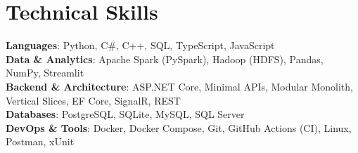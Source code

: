 \documentclass[letterpaper,11pt]{article}
\begin{document}
\section{Technical Skills}
 \begin{itemize}[leftmargin=0.15in, label={}]
    \small{\item{
     \textbf{Languages}{: Python, C\#, C++, SQL, TypeScript, JavaScript} \\
     \textbf{Data \& Analytics}{: Apache Spark (PySpark), Hadoop (HDFS), Pandas, NumPy, Streamlit} \\
     \textbf{Backend \& Architecture}{: ASP.NET Core, Minimal APIs, Modular Monolith, Vertical Slices, EF Core, SignalR, REST} \\
     \textbf{Databases}{: PostgreSQL, SQLite, MySQL, SQL Server} \\
     \textbf{DevOps \& Tools}{: Docker, Docker Compose, Git, GitHub Actions (CI), Linux, Postman, xUnit}
    }}
 \end{itemize}


\end{document}

